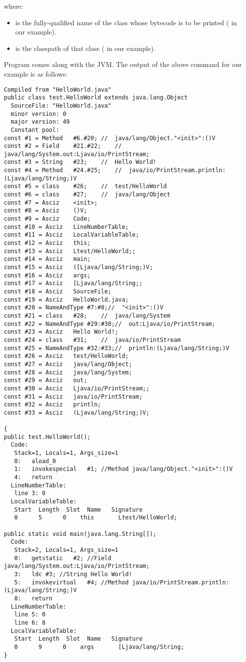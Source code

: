where:

\begin{itemize}
\item
{\tt <CLASS NAME>} is the fully-qualified name of the class whose
bytecode is to be printed ( in our example).
\item
{} is the classpath of that class ( in our example).
\end{itemize}

Program  comes along with the JVM.  The output of the
above command for our example is as follows:

\begin{framed}
\begin{verbatim}
Compiled from "HelloWorld.java"
public class test.HelloWorld extends java.lang.Object
  SourceFile: "HelloWorld.java"
  minor version: 0
  major version: 49
  Constant pool:
const #1 = Method   #6.#20; //  java/lang/Object."<init>":()V
const #2 = Field    #21.#22;    //  java/lang/System.out:Ljava/io/PrintStream;
const #3 = String   #23;    //  Hello World!
const #4 = Method   #24.#25;    //  java/io/PrintStream.println:(Ljava/lang/String;)V
const #5 = class    #26;    //  test/HelloWorld
const #6 = class    #27;    //  java/lang/Object
const #7 = Asciz    <init>;
const #8 = Asciz    ()V;
const #9 = Asciz    Code;
const #10 = Asciz   LineNumberTable;
const #11 = Asciz   LocalVariableTable;
const #12 = Asciz   this;
const #13 = Asciz   Ltest/HelloWorld;;
const #14 = Asciz   main;
const #15 = Asciz   ([Ljava/lang/String;)V;
const #16 = Asciz   args;
const #17 = Asciz   [Ljava/lang/String;;
const #18 = Asciz   SourceFile;
const #19 = Asciz   HelloWorld.java;
const #20 = NameAndType #7:#8;//  "<init>":()V
const #21 = class   #28;    //  java/lang/System
const #22 = NameAndType #29:#30;//  out:Ljava/io/PrintStream;
const #23 = Asciz   Hello World!;
const #24 = class   #31;    //  java/io/PrintStream
const #25 = NameAndType #32:#33;//  println:(Ljava/lang/String;)V
const #26 = Asciz   test/HelloWorld;
const #27 = Asciz   java/lang/Object;
const #28 = Asciz   java/lang/System;
const #29 = Asciz   out;
const #30 = Asciz   Ljava/io/PrintStream;;
const #31 = Asciz   java/io/PrintStream;
const #32 = Asciz   println;
const #33 = Asciz   (Ljava/lang/String;)V;

{
public test.HelloWorld();
  Code:
   Stack=1, Locals=1, Args_size=1
   0:   aload_0
   1:   invokespecial   #1; //Method java/lang/Object."<init>":()V
   4:   return
  LineNumberTable:
   line 3: 0
  LocalVariableTable:
   Start  Length  Slot  Name   Signature
   0      5      0    this       Ltest/HelloWorld;

public static void main(java.lang.String[]);
  Code:
   Stack=2, Locals=1, Args_size=1
   0:   getstatic   #2; //Field java/lang/System.out:Ljava/io/PrintStream;
   3:   ldc #3; //String Hello World!
   5:   invokevirtual   #4; //Method java/io/PrintStream.println:(Ljava/lang/String;)V
   8:   return
  LineNumberTable:
   line 5: 0
   line 6: 8
  LocalVariableTable:
   Start  Length  Slot  Name   Signature
   0      9      0    args       [Ljava/lang/String;
}
\end{verbatim}
\end{framed}

